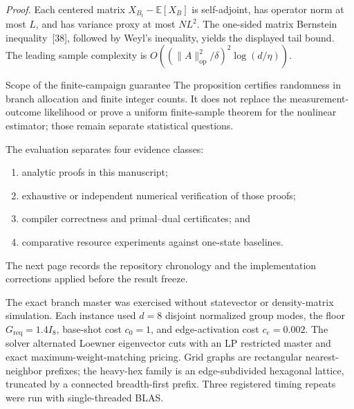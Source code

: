 \documentclass[11pt]{article}
\newcommand{\Sect}[1]{\vspace{0.35em}{\large\bfseries #1}\par\vspace{0.25em}}
\newcommand{\SubSect}[1]{\vspace{0.22em}{\large\bfseries #1}\par\vspace{0.18em}}
\begin{document}
\emph{Proof.} Each centered matrix $X_{B_t}-\mathbb E[X_B]$ is self-adjoint, has operator norm at most $L$, and has variance proxy at most $NL^2$. The one-sided matrix Bernstein inequality~[38], followed by Weyl's inequality, yields the displayed tail bound. The leading sample complexity is
$O((\lVert A\rVert_{\mathrm{op}}^2/\delta)^2\log(d/\eta))$.

\begin{scopebox}{Scope of the finite-campaign guarantee}
The proposition certifies randomness in branch allocation and finite integer counts. It does not replace the measurement-outcome likelihood or prove a uniform finite-sample theorem for the nonlinear estimator; those remain separate statistical questions.
\end{scopebox}

\vspace{0.7em}
\Sect{13\quad Experimental methodology}
\SubSect{13.1\quad Evidence classes and repository chronology}
The evaluation separates four evidence classes:
\begin{enumerate}[label=(\roman*),leftmargin=2.2em,itemsep=0pt,topsep=0.15em]
\item analytic proofs in this manuscript;
\item exhaustive or independent numerical verification of those proofs;
\item compiler correctness and primal--dual certificates; and
\item comparative resource experiments against one-state baselines.
\end{enumerate}
The next page records the repository chronology and the implementation corrections applied before the result freeze.

\clearpage
\setcounter{page}{41}
\thispagestyle{plain}
\fontsize{9.2}{11.2}\selectfont
\Sect{14.9\quad Compiler-only scale on grid and heavy-hex graphs}
The exact branch master was exercised without statevector or density-matrix simulation. Each instance used $d=8$ disjoint normalized group modes, the floor $G_{\mathrm{req}}=1.4I_8$, base-shot cost $c_0=1$, and edge-activation cost $c_e=0.002$. The solver alternated Loewner eigenvector cuts with an LP restricted master and exact maximum-weight-matching pricing. Grid graphs are rectangular nearest-neighbor prefixes; the heavy-hex family is an edge-subdivided hexagonal lattice, truncated by a connected breadth-first prefix. Three registered timing repeats were run with single-threaded BLAS.
\end{document}
